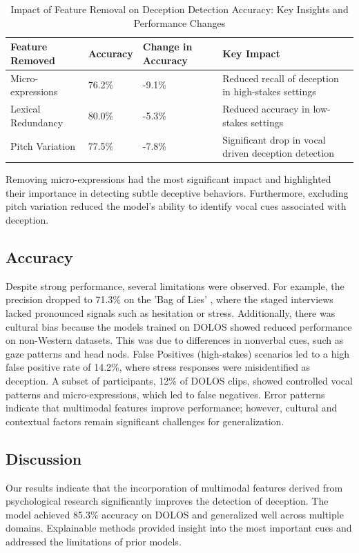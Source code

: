 \documentclass[11pt]{article}
\begin{document}
\begin{table}
\centering
\footnotesize
\renewcommand{\arraystretch}{1.3}
\addtolength{\tabcolsep}{-2.5pt}
\begin{tabular}{p{1.5cm} l p{1.5cm} p{2cm}}
\hline
\textbf{Feature Removed} & \textbf{Accuracy} & \textbf{Change in Accuracy}& \textbf{Key Impact }\\
\hline
Micro-expressions  & 76.2\% & -9.1\% & Reduced recall of deception in high-stakes settings \\
Lexical Redundancy & 80.0\% & -5.3\% & Reduced accuracy in low-stakes settings \\
Pitch Variation & 77.5\% & -7.8\% & Significant drop in vocal driven deception detection \\
\hline

\end{tabular}

\caption{Impact of Feature Removal on Deception Detection Accuracy: Key Insights and Performance Changes}
\label{tab:feature_removal}
\end{table}

Removing micro-expressions had the most significant impact and highlighted their importance in detecting subtle deceptive behaviors. Furthermore, excluding pitch variation reduced the model’s ability to identify vocal cues associated with deception. 

\subsection{Accuracy}
Despite strong performance, several limitations were observed. For example, the precision dropped to 71.3\% on the 'Bag of Lies' \citep{9025340}, where the staged interviews lacked pronounced signals such as hesitation or stress. Additionally, there was cultural bias because the models trained on DOLOS showed reduced performance on non-Western datasets. This was due to differences in nonverbal cues, such as gaze patterns and head nods. False Positives (high-stakes) scenarios led to a high false positive rate of 14.2\%, where stress responses were misidentified as deception. A subset of participants, 12\% of DOLOS clips, showed controlled vocal patterns and micro-expressions, which led to false negatives. Error patterns indicate that multimodal features improve performance; however, cultural and contextual factors remain significant challenges for generalization. 

\subsection{Discussion}
Our results indicate that the incorporation of multimodal features derived from psychological research significantly improves the detection of deception. The model achieved 85.3\% accuracy on DOLOS and generalized well across multiple domains. Explainable methods provided insight into the most important cues and addressed the limitations of prior models.
\end{document}
